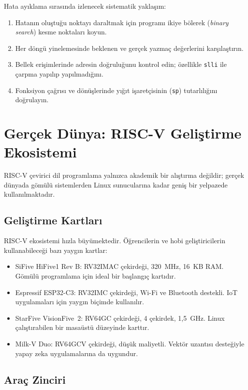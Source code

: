 Hata ayıklama sırasında izlenecek sistematik yaklaşım:
\begin{enumerate}
\item Hatanın oluştuğu noktayı daraltmak için programı ikiye bölerek (\emph{binary search}) kesme noktaları koyun.
\item Her döngü yinelemesinde beklenen ve gerçek yazmaç değerlerini karşılaştırın.
\item Bellek erişimlerinde adresin doğruluğunu kontrol edin; özellikle \texttt{slli} ile çarpma yapılıp yapılmadığını.
\item Fonksiyon çağrısı ve dönüşlerinde yığıt işaretçisinin (\texttt{sp}) tutarlılığını doğrulayın.
\end{enumerate}


\section{Gerçek Dünya: RISC-V Geliştirme Ekosistemi}
\label{sec:gercek-dunya-programlama}

RISC-V çevirici dil programlama yalnızca akademik bir alıştırma değildir; gerçek dünyada gömülü sistemlerden Linux sunucularına kadar geniş bir yelpazede kullanılmaktadır.

\subsection{Geliştirme Kartları}

RISC-V ekosistemi hızla büyümektedir. Öğrencilerin ve hobi geliştiricilerin kullanabileceği bazı yaygın kartlar:

\begin{itemize}
\item SiFive HiFive1 Rev B: RV32IMAC çekirdeği, 320~MHz, 16~KB RAM. Gömülü programlama için ideal bir başlangıç kartıdır.
\item Espressif ESP32-C3: RV32IMC çekirdeği, Wi-Fi ve Bluetooth destekli. IoT uygulamaları için yaygın biçimde kullanılır.
\item StarFive VisionFive~2: RV64GC çekirdeği, 4 çekirdek, 1,5~GHz. Linux çalıştırabilen bir masaüstü düzeyinde karttır.
\item Milk-V Duo: RV64GCV çekirdeği, düşük maliyetli. Vektör uzantısı desteğiyle yapay zeka uygulamalarına da uygundur.
\end{itemize}

\subsection{Araç Zinciri}

